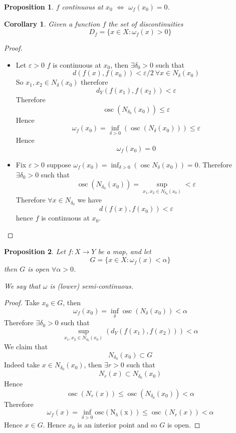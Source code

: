 \documentclass[11pt,openany]{book}
\theoremstyle{plain}
\newtheorem{corollary}{Corollary}[chapter]
\newtheorem{proposition}{Proposition}[chapter]
\theoremstyle{definition}
\theoremstyle{remark}
\newcommand{\set}[1]{\{ #1 \}}
\begin{document}
\begin{proposition}
    $f$ continuous at $x_0$ $\iff$ $\omega_f(x_0) = 0$.
\end{proposition}

\begin{corollary}
    Given a function $f$ the set of discontinuities 
    $$D_f = \set{x \in X \colon \omega_f (x) > 0}$$
\end{corollary}

\begin{proof}
    \begin{itemize}
        \item[$\implies$] Let $\varepsilon > 0$ $f$ is continuous at $x_0$, then $\exists \delta_0 > 0$ such that
        $$d(f(x), f(x_0)) < \varepsilon/2 \ \forall x \in N_\delta(x_0)$$
        So $x_1, x_2 \in N_\delta(x_0)$ therefore 
        $$d_Y(f(x_1), f(x_2)) < \varepsilon$$
        Therefore 
        $$\operatorname{osc}(N_{\delta_0} (x_0)) \le \varepsilon$$
        Hence 
        $$\omega_f (x_0) = \inf_{\delta > 0} (\operatorname{osc} (N_{\delta} (x_0))) \le \varepsilon$$
        Hence 
        $$\omega_f(x_0) = 0$$

        \item[$\impliedby$] Fix $\varepsilon > 0$ suppose $\omega_f (x_0) = \inf_{\delta > 0} (\operatorname{osc} N_\delta(x_0)) = 0$. 
        Therefore $\exists \delta_0 > 0$ such that
        $$\operatorname{osc} (N_{\delta_0} (x_0)) = \sup_{x_1, x_2 \in N_{\delta_0} (x_0)} < \varepsilon$$
        Therefore $\forall x \in N_{\delta_0}$ we have 
        $$d(f(x), f(x_0)) < \varepsilon$$
        hence $f$ is continuous at $x_0$.  
    \end{itemize}
\end{proof}

\begin{proposition}
    Let $f \colon X \to Y$ be a map, and let 
    $$G = \set{x \in X \colon \omega_f (x) < \alpha}$$
    then $G$ is open $\forall \alpha > 0$.     

    We say that $\omega$ is (lower) semi-continuous.
\end{proposition}

\begin{proof}
    Take $x_0 \in G$, then 
    $$\omega_f (x_0) = \inf_{\delta} \operatorname{osc} (N_\delta(x_0)) < \alpha$$
    Therefore $\exists \delta_0 > 0$ such that
    $$\sup_{x_1, x_2 \in N_{\delta_0 }(x_0)} (d_Y(f(x_1), f(x_2))) < \alpha$$
    We claim that 
    $$N_{\delta_0} (x_0) \subset G$$
    Indeed take $x \in N_{\delta_0} (x_0)$, then $\exists r > 0$ such that
    $$N_r(x) \subset N_{\delta_0} (x_0)$$
    Hence 
    $$\operatorname{osc}(N_r(x)) \le \operatorname{osc} (N_{\delta_0} (x_0)) < \alpha$$
    Therefore 
    $$\omega_f (x) = \inf_{\delta > 0} \operatorname{osc (N_\delta(x))} \le \operatorname{osc} (N_r(x)) < \alpha$$
    Hence $x \in G$. Hence $x_0$ is an interior point and so $G$ is open. 
\end{proof}
\end{document}
